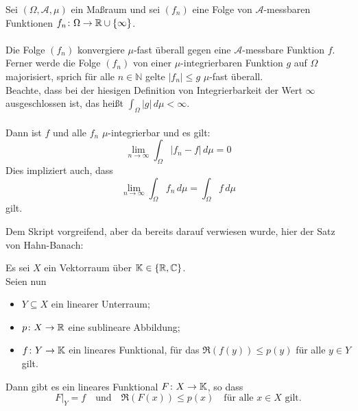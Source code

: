 \begin{satznbfr}[Lebesgue]  \label{satz:x-SatzvonLebesgue}
Sei $(\Omega,\mathcal{A},\mu)$ ein Maßraum und sei $\left(f_n\right)$ eine Folge von $\mathcal{A}$-messbaren Funktionen $f_n \colon \Omega\rightarrow\mathbb{R}\cup\{\infty\}$. \\ \\
Die Folge $\left( f_n \right)$ konvergiere $\mu$-fast überall gegen eine $\mathcal{A}$-messbare Funktion $f$. Ferner werde die Folge $\left(f_n\right)$ von einer $\mu$-integrierbaren Funktion $g$ auf $\Omega$ majorisiert, sprich für alle $n \in \mathbb{N}$ gelte $|f_{n}| \leq g$ $\mu$-fast überall. \\
Beachte, dass bei der hiesigen Definition von Integrierbarkeit der Wert $\infty$ ausgeschlossen ist, das heißt $\int_\Omega|g|\,d\mu < \infty$. \\ \\
Dann ist $f$ und alle $f_n$ $\mu$-integrierbar und es gilt:
	\[ \lim_{n \rightarrow \infty}\int_\Omega{|f_n - f|}\,d\mu = 0 \]
Dies impliziert auch, dass
	\[ \lim_{n \rightarrow \infty}\int_\Omega{f_n\,}d\mu = \int_\Omega{f\,}d\mu \]
gilt.
\end{satznbfr}


Dem Skript vorgreifend, aber da bereits darauf verwiesen wurde, hier der Satz von Hahn-Banach:


\begin{satznbfr}  \label{satz:x-hahn-banach}
	Es sei $X$ ein Vektorraum über $\mathbb{K} \in \{ \mathbb{R}, \mathbb{C} \}$. \\
	Seien nun
	\begin{itemize}
		\item $Y \subseteq X$ ein linearer Unterraum;
		\item $p \colon X \rightarrow \mathbb{R}$ eine sublineare Abbildung;
		\item $f \colon Y \rightarrow \mathbb{K}$ ein lineares Funktional, für das $\Re(f(y)) \leq p(y)$ für alle $y \in Y$ gilt.
	\end{itemize}
	Dann gibt es ein lineares Funktional $F \colon X \rightarrow \mathbb{K}$, so dass
	\[ F|_{Y} = f \quad \text{und} \quad \Re(F(x)) \leq p(x) \quad \text{für alle } x \in X \text{ gilt.} \]
\end{satznbfr}



\newpage